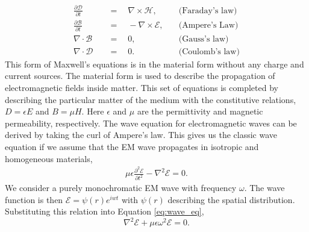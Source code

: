 \documentclass[letterpaper]{ar-1col}
\begin{document}
\begin{equation}
\begin{aligned}
\frac{\partial\mathcal{D}}{\partial t} \quad & = \quad \nabla\times\mathcal{H},   & \quad \text{(Faraday's law)} \\[5pt]
\frac{\partial\mathcal{B}}{\partial t} \quad & = \quad -\nabla\times\mathcal{E},  & \quad \text{(Ampere's Law)}   \\[5pt]
\nabla\cdot\mathcal{B}                 \quad & = \quad 0,                         & \quad \text{(Gauss's law)}   \\[5pt]
\nabla\cdot\mathcal{D}                 \quad & = \quad 0.                         & \quad \text{(Coulomb's law)}
\end{aligned}
\end{equation}
This form of Maxwell's equations is in the material form without any charge and current sources.
%
The material form is used to describe the propagation of electromagnetic fields inside matter.
%
This set of equations is completed by describing the particular matter of the medium with the constitutive relations, $D=\epsilon E$ and $B=\mu H$. 
%
Here $\epsilon$ and $\mu$ are the permittivity and magnetic permeability, respectively.
%
The wave equation for electromagnetic waves can be derived by taking the curl of Ampere's law.
%
This gives us the classic wave equation if we assume that the EM wave propagates in isotropic and homogeneous materials,
\begin{equation}
\label{eq:wave_eq}
\begin{aligned}
\mu \epsilon \frac{\partial^2 \mathcal{E}}{\partial t^2} - \nabla^2\mathcal{E} = 0 .
\end{aligned}
\end{equation}
We consider a purely monochromatic EM wave with frequency $\omega$.
%
The wave function is then $\mathcal{E}=\psi(r) e^{iwt}$ with $\psi(r)$ describing the spatial distribution.
%
Substituting this relation into Equation \ref{eq:wave_eq},
\begin{equation}
\nabla^2\mathcal{E} +\mu \epsilon \omega^2 \mathcal{E} = 0.
\end{equation}
\end{document}
